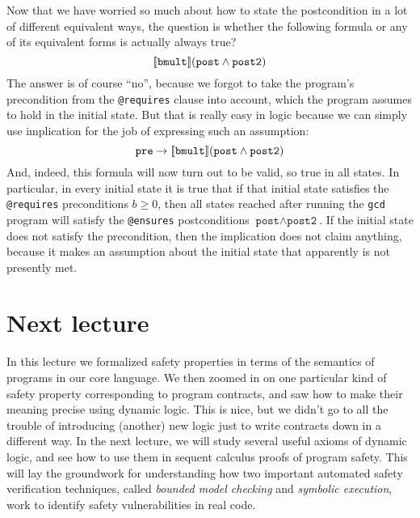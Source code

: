 \documentclass[11pt,twoside]{scrartcl}
\begin{document}
Now that we have worried so much about how to state the postcondition in a lot of different equivalent ways, the question is whether the following formula or any of its equivalent forms is actually always true?
\[
\dbox{\texttt{bmult}}{(\texttt{post} \land \texttt{post2})}
\]
The answer is of course ``no'', because we forgot to take the program's precondition from the \verb'@requires' clause into account, which the program assumes to hold in the initial state.
But that is really easy in logic because we can simply use implication for the job of expressing such an assumption:
\[
\texttt{pre} \limply
\dbox{\texttt{bmult}}{(\texttt{post} \land \texttt{post2})}
\]
And, indeed, this formula will now turn out to be valid, so true in all states.
In particular, in every initial state it is true that if that initial state satisfies the \verb'@requires' preconditions \(b \ge 0\), then all states reached after running the \texttt{gcd} program will satisfy the \verb'@ensures' postconditions \(\texttt{post} \land \texttt{post2}\).
If the initial state does not satisfy the precondition, then the implication does not claim anything, because it makes an assumption about the initial state that apparently is not presently met.

\section{Next lecture}
In this lecture we formalized safety properties in terms of the semantics of programs in our core language. We then zoomed in on one particular kind of safety property corresponding to program contracts, and saw how to make their meaning precise using dynamic logic. This is nice, but we didn't go to all the trouble of introducing (another) new logic just to write contracts down in a different way. In the next lecture, we will study several useful axioms of dynamic logic, and see how to use them in sequent calculus proofs of program safety. This will lay the groundwork for understanding how two important automated safety verification techniques, called \emph{bounded model checking} and \emph{symbolic execution}, work to identify safety vulnerabilities in real code.



\end{document}
